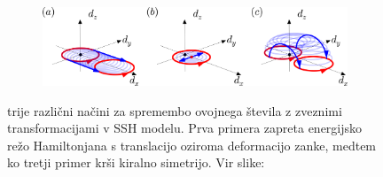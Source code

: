 \begin{figure}[H]
\centering
\begin{subfigure}{.9\textwidth}
\includegraphics[width=\linewidth]{Figures/SymBreak.png}
\end{subfigure}
\caption{trije različni načini za spremembo ovojnega števila z zveznimi transformacijami v SSH modelu. Prva primera zapreta energijsko režo Hamiltonjana s translacijo oziroma deformacijo zanke, medtem ko tretji primer krši kiralno simetrijo. Vir slike: \cite{madzar}}
\label{fig:symbreak}
\end{figure}

